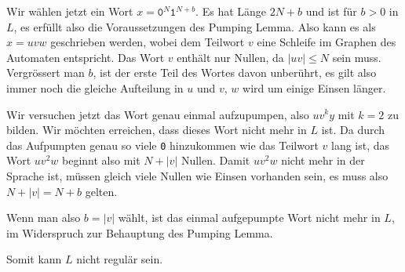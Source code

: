 \begin{loesung}
Wir wählen jetzt ein Wort $x=\texttt{0}^N\texttt{1}^{N+b}$.
Es hat Länge $2N+b$ und ist für $b>0$ in $L$, es erfüllt also die
Voraussetzungen des Pumping Lemma.
Also kann es als $x=uvw$ geschrieben werden, wobei dem Teilwort $v$ eine
Schleife im Graphen des Automaten entspricht.
Das Wort $v$ enthält nur Nullen, da $|uv|\le N$ sein muss.
Vergrössert man $b$, ist der erste Teil des Wortes davon unberührt,
es gilt also immer noch die gleiche Aufteilung in $u$ und $v$,
$w$ wird um einige Einsen länger.

Wir versuchen jetzt das Wort genau einmal aufzupumpen, also $uv^ky$ mit
$k=2$ zu bilden.
Wir möchten erreichen, dass dieses Wort nicht mehr in $L$ ist.
Da durch das Aufpumpten genau so viele \texttt{0} hinzukommen wie das
Teilwort $v$ lang ist, das Wort $uv^2w$ beginnt also mit $N+|v|$ Nullen.
Damit $uv^2w$ nicht mehr in der Sprache ist, müssen gleich viele Nullen
wie Einsen vorhanden sein, es muss also $N+|v|=N+b$ gelten.
\begin{center}
\end{center}
Wenn man also $b=|v|$ wählt, ist das einmal aufgepumpte Wort nicht
mehr in $L$, im Widerspruch zur Behauptung des Pumping Lemma.

Somit kann $L$ nicht regulär sein.
\end{loesung}
